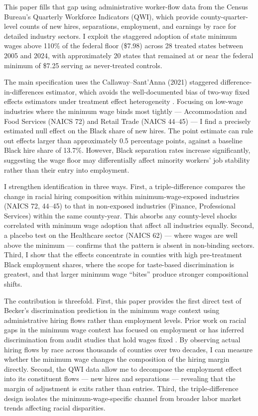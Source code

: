 \documentclass[12pt]{article}
\begin{document}
This paper fills that gap using administrative worker-flow data from the Census Bureau's Quarterly Workforce Indicators (QWI), which provide county-quarter-level counts of new hires, separations, employment, and earnings by race for detailed industry sectors. I exploit the staggered adoption of state minimum wages above 110\% of the federal floor (\$7.98) across 28 treated states between 2005 and 2024, with approximately 20 states that remained at or near the federal minimum of \$7.25 serving as never-treated controls.

The main specification uses the Callaway--Sant'Anna (2021) staggered difference-in-differences estimator, which avoids the well-documented bias of two-way fixed effects estimators under treatment effect heterogeneity \citep{callaway2021difference, goodman2021difference, sun2021estimating}. Focusing on low-wage industries where the minimum wage binds most tightly --- Accommodation and Food Services (NAICS 72) and Retail Trade (NAICS 44--45) --- I find a precisely estimated null effect on the Black share of new hires. The point estimate can rule out effects larger than approximately 0.5 percentage points, against a baseline Black hire share of 13.7\%. However, Black separation rates increase significantly, suggesting the wage floor may differentially affect minority workers' job stability rather than their entry into employment.

I strengthen identification in three ways. First, a triple-difference compares the change in racial hiring composition within minimum-wage-exposed industries (NAICS 72, 44--45) to that in non-exposed industries (Finance, Professional Services) within the same county-year. This absorbs any county-level shocks correlated with minimum wage adoption that affect all industries equally. Second, a placebo test on the Healthcare sector (NAICS 62) --- where wages are well above the minimum --- confirms that the pattern is absent in non-binding sectors. Third, I show that the effects concentrate in counties with high pre-treatment Black employment shares, where the scope for taste-based discrimination is greatest, and that larger minimum wage ``bites'' produce stronger compositional shifts.

The contribution is threefold. First, this paper provides the first direct test of Becker's discrimination prediction in the minimum wage context using administrative hiring flows rather than employment levels. Prior work on racial gaps in the minimum wage context has focused on employment \citep{neumark2006minimum, aaronson2018industry, wursten2023minimum} or has inferred discrimination from audit studies that hold wages fixed \citep{bertrand2004emily, kline2022systemic}. By observing actual hiring flows by race across thousands of counties over two decades, I can measure whether the minimum wage changes the composition of the hiring margin directly. Second, the QWI data allow me to decompose the employment effect into its constituent flows --- new hires and separations --- revealing that the margin of adjustment is exits rather than entries. Third, the triple-difference design isolates the minimum-wage-specific channel from broader labor market trends affecting racial disparities.
\end{document}
